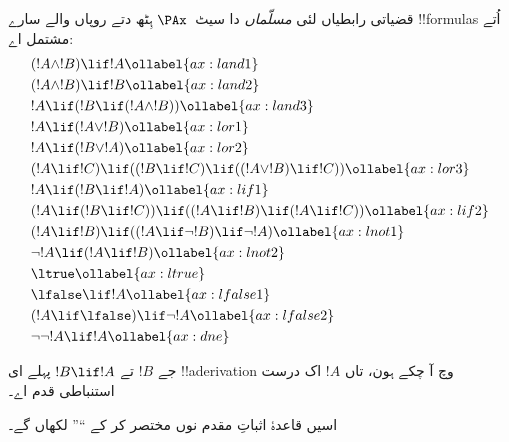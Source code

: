 \documentclass[../../../include/open-logic-section]{subfiles}
\begin{document}
      {}
      {}


\begin{defn}[مسلّمے]
قضیاتی رابطیاں لئی \emph{مسلّماں} دا سیٹ~$\PAx$ ہِٹھ دتے روپاں والے
سارے !!{formula}s اُتے مشتمل اے:
\begin{align}
  & (!A \land !B) \lif !A \ollabel{ax:land1}\\
  & (!A \land !B) \lif !B \ollabel{ax:land2}\\
  & !A \lif (!B \lif (!A \land !B)) \ollabel{ax:land3}\\
  & !A \lif (!A \lor !B) \ollabel{ax:lor1}\\
  & !A \lif (!B \lor !A) \ollabel{ax:lor2}\\
  & (!A \lif !C) \lif ((!B \lif !C) \lif ((!A \lor !B) \lif !C)) \ollabel{ax:lor3}\\
  & !A \lif (!B \lif !A) \ollabel{ax:lif1}\\
  & (!A \lif (!B \lif !C)) \lif ((!A \lif !B) \lif (!A \lif !C)) \ollabel{ax:lif2}\\
  & (!A \lif !B) \lif ((!A \lif \lnot !B) \lif \lnot !A) \ollabel{ax:lnot1}\\
  & \lnot !A \lif (!A \lif !B) \ollabel{ax:lnot2}\\
  & \ltrue \ollabel{ax:ltrue}\\
  & \lfalse \lif !A \ollabel{ax:lfalse1}\\
  & (!A \lif \lfalse) \lif \lnot !A \ollabel{ax:lfalse2}\\
  & \lnot\lnot !A \lif !A \ollabel{ax:dne}
\end{align}
\end{defn}

\begin{defn}
  جے $!B$ تے $!B \lif !A$ پہلے ای !!a{derivation} وچ آ چکے ہون، تاں $!A$
  اک درست استنباطی قدم اے۔
\end{defn}

اسیں قاعدۂ اثباتِ مقدم نوں مختصر کر کے ``\MP'' لکھاں گے۔
\end{document}
